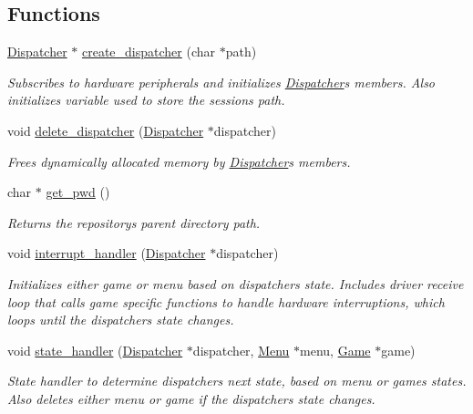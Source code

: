 \subsection*{Functions}
\begin{DoxyCompactItemize}
\item 
\hyperlink{struct_dispatcher}{Dispatcher} $\ast$ \hyperlink{group__dispatcher_ga806e2b40b340c9431427c77f94e859fa}{create\+\_\+dispatcher} (char $\ast$path)
\begin{DoxyCompactList}\small\item\em Subscribes to hardware peripherals and initializes \hyperlink{struct_dispatcher}{Dispatcher}\textquotesingle{}s members. Also initializes variable used to store the session\textquotesingle{}s path. \end{DoxyCompactList}\item 
void \hyperlink{group__dispatcher_ga4a58ba5ba48cbbaa0aad022b75685942}{delete\+\_\+dispatcher} (\hyperlink{struct_dispatcher}{Dispatcher} $\ast$dispatcher)
\begin{DoxyCompactList}\small\item\em Frees dynamically allocated memory by \hyperlink{struct_dispatcher}{Dispatcher}\textquotesingle{}s members. \end{DoxyCompactList}\item 
char $\ast$ \hyperlink{group__dispatcher_ga5ac2060f25333e39dcf8ea5a304b310f}{get\+\_\+pwd} ()
\begin{DoxyCompactList}\small\item\em Returns the repository\textquotesingle{}s parent directory path. \end{DoxyCompactList}\item 
void \hyperlink{group__dispatcher_ga2f999b67515a92fc53d29324552cd141}{interrupt\+\_\+handler} (\hyperlink{struct_dispatcher}{Dispatcher} $\ast$dispatcher)
\begin{DoxyCompactList}\small\item\em Initializes either game or menu based on dispatcher\textquotesingle{}s state. Includes driver receive loop that calls game specific functions to handle hardware interruptions, which loops until the dispatcher\textquotesingle{}s state changes. \end{DoxyCompactList}\item 
void \hyperlink{group__dispatcher_ga3b358623605878251bcfa528381cb15e}{state\+\_\+handler} (\hyperlink{struct_dispatcher}{Dispatcher} $\ast$dispatcher, \hyperlink{struct_menu}{Menu} $\ast$menu, \hyperlink{struct_game}{Game} $\ast$game)
\begin{DoxyCompactList}\small\item\em State handler to determine dispatcher\textquotesingle{}s next state, based on menu or game\textquotesingle{}s states. Also deletes either menu or game if the dispatcher\textquotesingle{}s state changes. \end{DoxyCompactList}\end{DoxyCompactItemize}


